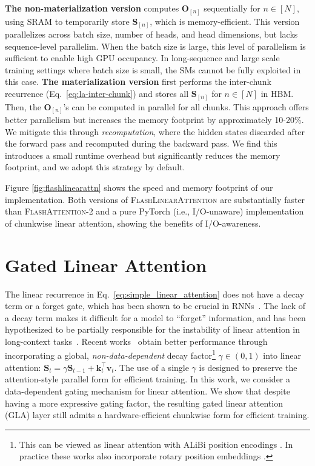 \textbf{The non-materialization version} computes ${\mathbf{O}}_{[n]}$ sequentially for $n \in [N]$, using SRAM to temporarily store ${\mathbf{S}}_{[n]}$, which is memory-efficient. This version parallelizes across batch size, number of heads, and head dimensions, but lacks sequence-level parallelim. When the batch size is large, this level of parallelism is sufficient to enable high GPU occupancy. In long-sequence and large scale training settings where batch size is small, the SMs cannot be fully exploited in this case. \textbf{The materialization version} first performs the inter-chunk recurrence (Eq.~\ref{eq:la-inter-chunk}) and stores all ${\mathbf{S}}_{[n]}$ for $n \in [N]$ in HBM. Then, the ${\mathbf{O}}_{[n]}$'s can be computed in parallel for all chunks. This approach offers better parallelism but increases the memory footprint by approximately 10-20\%. We mitigate this through \textit{recomputation}, where the hidden states discarded  after the forward pass and recomputed during the backward pass. We find this introduces a small runtime  overhead but significantly reduces the memory footprint, and  we adopt this strategy by default.

 Figure \ref{fig:flashlinearattn} shows the speed and memory footprint of our implementation. Both versions of \textsc{FlashLinearAttention} are substantially faster than \textsc{FlashAttention-2} \cite{flashattention2} and a pure PyTorch (i.e., I/O-unaware) implementation of chunkwise linear attention, showing the benefits of I/O-awareness. 

\section{Gated Linear Attention}

\label{sec:gla}

The linear recurrence in Eq.~\ref{eq:simple_linear_attention} does not have a decay term or a forget gate, which has been shown to be crucial in RNNs~\citep{HochSchm97,cho2014learning,unreasonable-forget-gate}. The lack of a decay term makes it difficult for a model to ``forget'' information, and has been hypothesized to be partially responsible for the instability of linear attention in long-context tasks~\citep{buckman2024}. Recent works~\citep{sun2023retentive,qin2023scaling} obtain better performance through incorporating a global, \emph{non-data-dependent}  decay factor\footnote{This can be viewed as linear attention with  ALiBi position encodings \cite{alibi2021}. In practice these works also incorporate  rotary position embeddings \citep[RoPE;][]{rope}.}
$\gamma \in (0, 1)$ into linear attention: $ {\mathbf{S}}_t = \gamma {\mathbf{S}}_{t-1} + {\bm{k}}_t^\intercal {\bm{v}}_t$.
The use of a single $\gamma$ is designed to preserve the attention-style parallel form for efficient training. In this work, we consider a data-dependent gating mechanism for linear attention. We show that despite having a more expressive gating factor, the resulting gated linear attention (GLA) layer still admits a hardware-efficient chunkwise form for efficient training.

